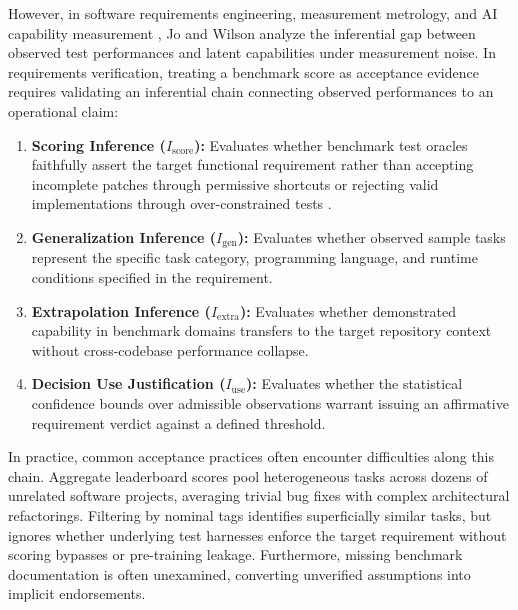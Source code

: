 \documentclass[runningheads]{llncs}
\begin{document}
However, in software requirements engineering, measurement metrology, and AI capability measurement \cite{aera_apa_ncme_standards_2014,jo_wilson_what_does_your_benchmark_measure,kane_validation}, Jo and Wilson analyze the inferential gap between observed test performances and latent capabilities under measurement noise. In requirements verification, treating a benchmark score as acceptance evidence requires validating an inferential chain connecting observed performances to an operational claim:
\begin{enumerate}[leftmargin=*]
    \item \textbf{Scoring Inference ($I_{\text{score}}$):} Evaluates whether benchmark test oracles faithfully assert the target functional requirement rather than accepting incomplete patches through permissive shortcuts or rejecting valid implementations through over-constrained tests \cite{ding_spec_oracle_gaps_2026,openai_swebench_audit_2026}.
    \item \textbf{Generalization Inference ($I_{\text{gen}}$):} Evaluates whether observed sample tasks represent the specific task category, programming language, and runtime conditions specified in the requirement.
    \item \textbf{Extrapolation Inference ($I_{\text{extra}}$):} Evaluates whether demonstrated capability in benchmark domains transfers to the target repository context without cross-codebase performance collapse.
    \item \textbf{Decision Use Justification ($I_{\text{use}}$):} Evaluates whether the statistical confidence bounds over admissible observations warrant issuing an affirmative requirement verdict against a defined threshold.
\end{enumerate}

In practice, common acceptance practices often encounter difficulties along this chain. Aggregate leaderboard scores pool heterogeneous tasks across dozens of unrelated software projects, averaging trivial bug fixes with complex architectural refactorings. Filtering by nominal tags identifies superficially similar tasks, but ignores whether underlying test harnesses enforce the target requirement without scoring bypasses or pre-training leakage. Furthermore, missing benchmark documentation is often unexamined, converting unverified assumptions into implicit endorsements.
\end{document}
